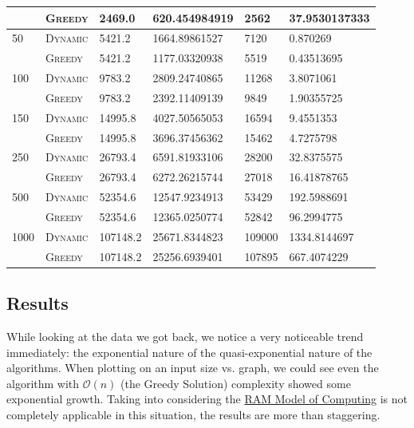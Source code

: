\documentclass{article}
\begin{document}
\begin{adjustwidth}{-.5cm}{}
\begin{center}
\begin{tabular}{l|lllll}
        & \textsc{Greedy}  & 2469.0    & 620.454984919    & 2562     &  37.9530137333        \\ \midrule
50      & \textsc{Dynamic} & 5421.2    & 1664.89861527    & 7120     &  0.870269             \\
        & \textsc{Greedy}  & 5421.2    & 1177.03320938    & 5519     &  0.43513695           \\ \midrule
100     & \textsc{Dynamic} & 9783.2    & 2809.24740865    & 11268    &  3.8071061            \\
        & \textsc{Greedy}  & 9783.2    & 2392.11409139    & 9849     &  1.90355725           \\ \midrule
150     & \textsc{Dynamic} & 14995.8   & 4027.50565053    & 16594    &  9.4551353            \\
        & \textsc{Greedy}  & 14995.8   & 3696.37456362    & 15462    &  4.7275798            \\ \midrule
250     & \textsc{Dynamic} & 26793.4   & 6591.81933106    & 28200    &  32.8375575           \\
        & \textsc{Greedy}  & 26793.4   & 6272.26215744    & 27018    &  16.41878765          \\ \midrule
500     & \textsc{Dynamic} & 52354.6   & 12547.9234913    & 53429    &  192.5988691          \\
        & \textsc{Greedy}  & 52354.6   & 12365.0250774    & 52842    &  96.2994775           \\ \midrule
1000    & \textsc{Dynamic} & 107148.2  & 25671.8344823    & 109000   &  1334.8144697         \\
        & \textsc{Greedy}  & 107148.2  & 25256.6939401    & 107895   &  667.4074229          \\
        \bottomrule
        \end{tabular}
    \end{center}
\end{adjustwidth}


\subsection{Results}
While looking at the data we got back, we notice a very noticeable trend immediately: the exponential nature of the quasi-exponential nature of the algorithms. When plotting on an input size vs. graph, we could see even the algorithm with $\mathcal{O}(n)$  (the Greedy Solution) complexity showed some exponential growth. Taking into considering the \href{https://en.wikipedia.org/wiki/Model_of_computation}{RAM Model of Computing} is not completely applicable in this situation, the results are more than staggering.
\end{document}
